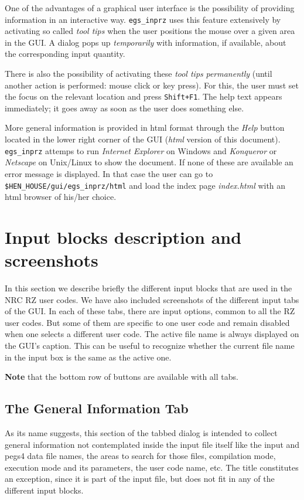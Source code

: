 \documentclass[12pt,twoside]{article}   %
\begin{document}
One of the advantages of a graphical user interface is the possibility of providing
information in an interactive way. {\tt egs\_inprz} uses this feature extensively by
activating so called {\em tool tips} when the user positions the mouse over a given area
in the GUI. A dialog pops up {\em temporarily} with information, if available, about the
corresponding input quantity.

There is also the possibility of activating these {\em tool tips} {\em permanently} (until
another action is performed: mouse click or key press). For this, the user must set the focus
on the relevant location and press {\tt Shift+F1}. The help text appears immediately; it goes
away as soon as the user does something else.

More general information is provided in html format through the {\em Help} button located
in the lower right corner of the GUI ({\em html} version of this document).
{\tt egs\_inprz} attemps to run {\em Internet Explorer} on Windows and
{\em Konqueror} or {\em Netscape} on Unix/Linux to show the document. If none of these
are available an error message is displayed. In that case the user can go to {\tt \$HEN\_HOUSE/gui/egs\_inprz/html} and load the index page {\em index.html} with an html
browser of his/her choice.

\section{Input blocks description and screenshots}
\label{screenshots}

In this section we describe briefly the different input blocks that are used in the NRC
RZ user codes.
We have also included screenshots of the different input tabs of the GUI. In each
of these tabs, there are input options, common to all the RZ user codes. But some of them are
specific to one user code and remain disabled when one selects a different user code.
The active file name is always displayed on the GUI's caption. This can be useful to recognize
whether the current file name in the input box is the same as the active one.

{\bf Note} that the bottom row of buttons are available with all tabs.


\newpage
\subsection{The General Information Tab}
\label{general}

As its name suggests, this section of the tabbed dialog is intended to collect general
information not contemplated inside the input file itself like the input and pegs4 data
file names, the areas to search for those files, compilation mode, execution mode and
its parameters,
the user code name, etc. The title constitutes an exception, since it is part of the input
file, but does not fit in any of the different input blocks.
\end{document}
